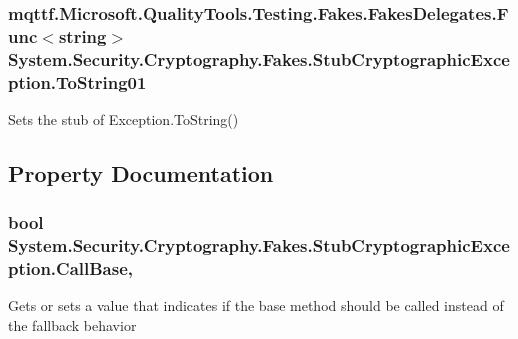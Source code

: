 \hypertarget{class_system_1_1_security_1_1_cryptography_1_1_fakes_1_1_stub_cryptographic_exception_a4127cccee6c3827acc7f515feb8e9548}{
\subsubsection[{To\-String01}]{\setlength{\rightskip}{0pt plus 5cm}mqttf.\-Microsoft.\-Quality\-Tools.\-Testing.\-Fakes.\-Fakes\-Delegates.\-Func$<$string$>$ System.\-Security.\-Cryptography.\-Fakes.\-Stub\-Cryptographic\-Exception.\-To\-String01}}\label{class_system_1_1_security_1_1_cryptography_1_1_fakes_1_1_stub_cryptographic_exception_a4127cccee6c3827acc7f515feb8e9548}


Sets the stub of Exception.\-To\-String()



\subsection{Property Documentation}
\hypertarget{class_system_1_1_security_1_1_cryptography_1_1_fakes_1_1_stub_cryptographic_exception_ae77d99860fbd15a06e6ad694968f780d}{
\subsubsection[{Call\-Base}]{\setlength{\rightskip}{0pt plus 5cm}bool System.\-Security.\-Cryptography.\-Fakes.\-Stub\-Cryptographic\-Exception.\-Call\-Base\hspace{0.3cm}{\ttfamily [get]}, {\ttfamily [set]}}}\label{class_system_1_1_security_1_1_cryptography_1_1_fakes_1_1_stub_cryptographic_exception_ae77d99860fbd15a06e6ad694968f780d}


Gets or sets a value that indicates if the base method should be called instead of the fallback behavior

